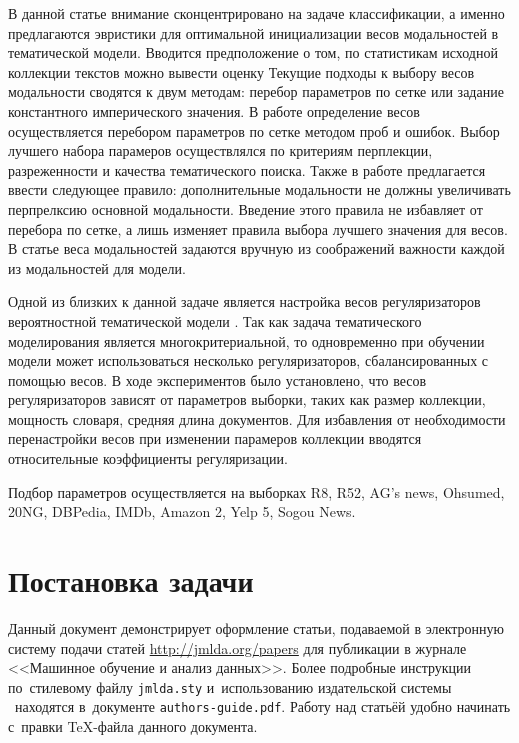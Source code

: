 \documentclass[12pt, twoside]{article}
\begin{document}
В данной статье внимание сконцентрировано на задаче классификации, а именно предлагаются эвристики для оптимальной инициализации весов модальностей в тематической модели. Вводится предположение о том, по статистикам исходной коллекции текстов можно вывести оценку 
Текущие подходы к выбору весов модальности сводятся к двум методам: перебор параметров по сетке или задание константного имперического значения. В работе \cite{vorontsov/blog_search} определение весов осуществляется перебором параметров по сетке методом проб и ошибок. Выбор лучшего набора парамеров осуществлялся по критериям перплекции, разреженности и качества тематического поиска. Также в работе \cite{vorontsov/transactions} предлагается ввести следующее правило: дополнительные модальности не должны увеличивать перпрелксию основной модальности. Введение этого правила не избавляет от перебора по сетке, а лишь изменяет правила выбора лучшего значения для весов. В статье \cite{vorontsov/hierarchical} веса модальностей задаются вручную из соображений важности каждой из модальностей для модели.

Одной из близких к данной задаче является настройка весов регуляризаторов вероятностной тематической модели \cite{vorontsov/artm_book}. Так как задача тематического моделирования является многокритериальной, то одновременно при обучении модели может использоваться несколько регуляризаторов, сбалансированных с помощью весов. В ходе экспериментов было установлено, что весов регуляризаторов зависят от параметров выборки, таких как размер коллекции, мощность словаря, средняя длина документов. Для избавления от необходимости перенастройки весов при изменении парамеров коллекции вводятся относительные коэффициенты регуляризации.

Подбор параметров осуществляется на выборках R8, R52, AG's news, Ohsumed, 20NG, DBPedia, IMDb, Amazon 2, Yelp 5, Sogou News. %

\section{Постановка задачи}
Данный документ демонстрирует оформление статьи,
подаваемой в электронную систему подачи статей \url{http://jmlda.org/papers} для публикации в журнале <<Машинное обучение и анализ данных>>.
Более подробные инструкции по~стилевому файлу \texttt{jmlda.sty} и~использованию издательской системы \LaTeXe\
находятся в~документе \texttt{authors-guide.pdf}.
Работу над статьёй удобно начинать с~правки \TeX-файла данного документа.
\end{document}
